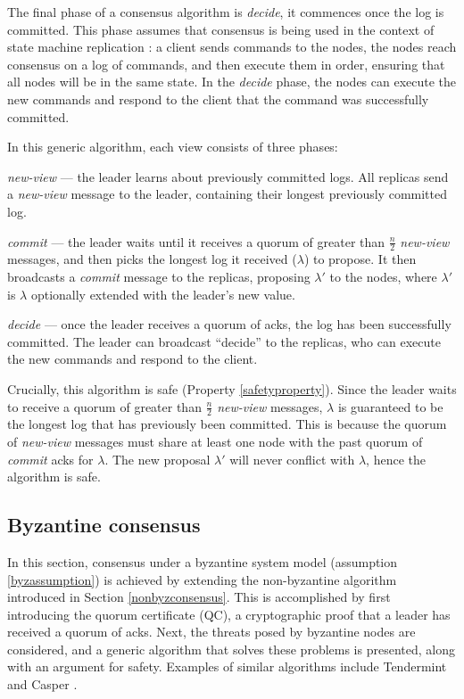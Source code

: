 The final phase of a consensus algorithm is \textit{decide}, it commences once the log is committed. This phase assumes that consensus is being used in the context of state machine replication \cite{lamportTimeClocksOrdering1978,schneiderImplementingFaulttolerantServices1990}: a client sends commands to the nodes, the nodes reach consensus on a log of commands, and then execute them in order, ensuring that all nodes will be in the same state. In the \textit{decide} phase, the nodes can execute the new commands and respond to the client that the command was successfully committed.

In this generic algorithm, each view consists of three phases:

\begin{description}
	\item \textit{new-view} --- the leader learns about previously committed logs. All replicas send a \textit{new-view} message to the leader, containing their longest previously committed log.
	\item \textit{commit} --- the leader waits until it receives a quorum of greater than $\frac{n}{2}$ \textit{new-view} messages, and then picks the longest log it received ($\lambda$) to propose. It then broadcasts a \textit{commit} message to the replicas, proposing $\lambda'$ to the nodes, where $\lambda'$ is $\lambda$ optionally extended with the leader's new value.
	\item \textit{decide} --- once the leader receives a quorum of acks, the log has been successfully committed. The leader can broadcast ``decide'' to the replicas, who can execute the new commands and respond to the client.
\end{description}

Crucially, this algorithm is safe (Property \ref{safetyproperty}). Since the leader waits to receive a quorum of greater than $\frac{n}{2}$ \textit{new-view} messages, $\lambda$ is guaranteed to be the longest log that has previously been committed. This is because the quorum of \textit{new-view} messages must share at least one node with the past quorum of \textit{commit} acks for $\lambda$. The new proposal $\lambda'$ will never conflict with $\lambda$, hence the algorithm is safe.

\subsection{Byzantine consensus} \label{byzconsensus}
In this section, consensus under a byzantine system model (assumption \ref{byzassumption}) is achieved by extending the non-byzantine algorithm introduced in Section \ref{nonbyzconsensus}. This is accomplished by first introducing the quorum certificate (QC), a cryptographic proof that a leader has received a quorum of acks. Next, the threats posed by byzantine nodes are considered, and a generic algorithm that solves these problems is presented, along with an argument for safety. Examples of similar algorithms include Tendermint \cite{kwonTendermintConsensusMining2014} and Casper \cite{buterinCasperFriendlyFinality2019}.


